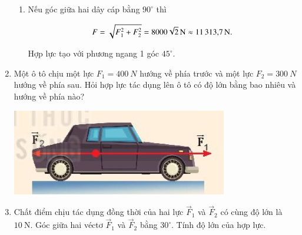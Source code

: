 \begin{enumerate}[label=\bfseries Bài \arabic*:,leftmargin=1.5cm]
{\begin{enumerate}[label=\alph*)]
			\item Nếu góc giữa hai dây cáp bằng $90^\circ$ thì
			
			$$F = \sqrt{F_1^2+F_2^2} = \xsi{8000\sqrt{2}}{\newton}\approx\SI{11313.7}{\newton}.$$
			
			Hợp lực tạo với phương ngang 1 góc $45^\circ$.
		\end{enumerate}
		
	}
	
	\item {}
	
	{
		Một ô tô chịu một lực $F_1 = \SI{400}{N}$ hướng về phía trước và một lực $F_2 = \SI{300}{N}$ hướng về phía sau. Hỏi hợp lực tác dụng lên ô tô có độ lớn bằng bao nhiêu và hướng về phía nào?
		
		\begin{center}
			\includegraphics[scale=0.7]{../figs/VN10-2022-PH-TP015-1.jpg}
		\end{center}
		
	}
	

	\item {}
	
	{ Chất điểm chịu tác dụng đồng thời của hai lực $\vec{F}_1$ và $\vec{F}_2$ có cùng độ lớn là $10\ \text{N}$. Góc giữa hai véctơ $\vec{F}_1$ và $\vec{F}_2$  bằng $30^\circ$. Tính độ lớn của hợp lực.
	}


\end{enumerate}

